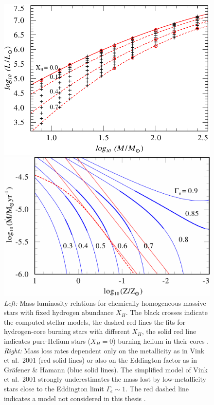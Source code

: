 \documentclass[a4paper,titlepage]{book}     	%
\begin{document}
 
\begin{figure}[h]
	\begin{minipage}{.49\textwidth}
		\centering
		\includegraphics[width=.94\textwidth]{./images/MLrelation.png}
	\end{minipage}
	\hfill
	\begin{minipage}{.49\textwidth}
		\centering
		\includegraphics[width=\textwidth]{./images/stellarwinds.pdf}	
	\end{minipage}
	\caption{\emph{Left:} Mass-luminosity relations for chemically-homogeneous massive stars with fixed hydrogen abundance $X_H$. The black crosses indicate the computed stellar models, the dashed red lines the fits for hydrogen-core burning stars with different $X_H$, the solid red line indicates pure-Helium stars ($X_H = 0$) burning helium in their cores \cite{Grafener2011_M-L_WR}. \emph{Right:} Mass loss rates dependent only on the metallicity as in Vink et al.\ 2001 \cite{Vink2001} (red solid lines) or also on the Eddington factor as in Gr{\"a}fener \& Hamann \cite{G&H_WRmassloss} (blue solid lines). The simplified model of Vink et al.\ 2001 strongly underestimates the mass lost by low-metallicity stars close to the Eddington limit $\Gamma_e \sim 1$. The red dashed line indicates a model not considered in this thesis \cite{G&H_WRmassloss}.}\label{fig:MLandwinds}
\end{figure}
\end{document}
